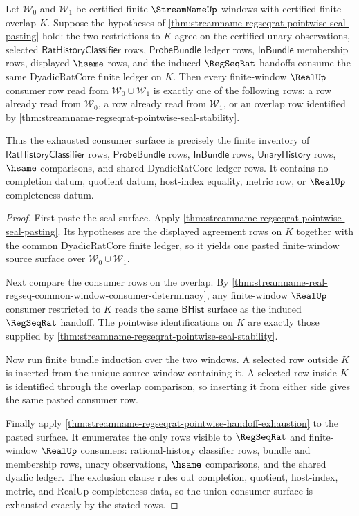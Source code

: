 

\begin{theorem}
\label{thm:streamname-regseqrat-overlap-pasting-consumer-exhaustion}
Let $\mathcal{W}_0$ and $\mathcal{W}_1$ be certified finite
$\StreamNameUp$ windows with certified finite overlap $K$. Suppose the
hypotheses of
\autoref{thm:streamname-regseqrat-pointwise-seal-pasting} hold: the two
restrictions to $K$ agree on the certified unary observations, selected
$\mathsf{RatHistoryClassifier}$ rows, $\mathsf{ProbeBundle}$ ledger rows,
$\mathsf{InBundle}$ membership rows, displayed $\hsame$ rows, and the induced
$\RegSeqRat$ handoffs consume the same DyadicRatCore finite ledger on $K$.
Then every finite-window $\RealUp$ consumer row read from
$\mathcal{W}_0 \cup \mathcal{W}_1$ is exactly one of the following rows: a row
already read from $\mathcal{W}_0$, a row already read from $\mathcal{W}_1$, or
an overlap row identified by
\autoref{thm:streamname-regseqrat-pointwise-seal-stability}.

Thus the exhausted consumer surface is precisely the finite inventory of
$\mathsf{RatHistoryClassifier}$ rows, $\mathsf{ProbeBundle}$ rows,
$\mathsf{InBundle}$ rows, $\mathsf{UnaryHistory}$ rows, $\hsame$ comparisons,
and shared DyadicRatCore ledger rows. It contains no completion datum, quotient
datum, host-index equality, metric row, or $\RealUp$ completeness datum.
\end{theorem}
\begin{proof}
First paste the seal surface. Apply
\autoref{thm:streamname-regseqrat-pointwise-seal-pasting}. Its hypotheses are
the displayed agreement rows on $K$ together with the common DyadicRatCore
finite ledger, so it yields one pasted finite-window source surface over
$\mathcal{W}_0 \cup \mathcal{W}_1$.

Next compare the consumer rows on the overlap. By
\autoref{thm:streamname-real-regseq-common-window-consumer-determinacy}, any
finite-window $\RealUp$ consumer restricted to $K$ reads the same
$\mathsf{BHist}$ surface as the induced $\RegSeqRat$ handoff. The pointwise
identifications on $K$ are exactly those supplied by
\autoref{thm:streamname-regseqrat-pointwise-seal-stability}.

Now run finite bundle induction over the two windows. A selected row outside
$K$ is inserted from the unique source window containing it. A selected row
inside $K$ is identified through the overlap comparison, so inserting it from
either side gives the same pasted consumer row.

Finally apply
\autoref{thm:streamname-regseqrat-pointwise-handoff-exhaustion} to the pasted
surface. It enumerates the only rows visible to $\RegSeqRat$ and finite-window
$\RealUp$ consumers: rational-history classifier rows, bundle and membership
rows, unary observations, $\hsame$ comparisons, and the shared dyadic ledger.
The exclusion clause rules out completion, quotient, host-index, metric, and
RealUp-completeness data, so the union consumer surface is exhausted exactly by
the stated rows.
\end{proof}

